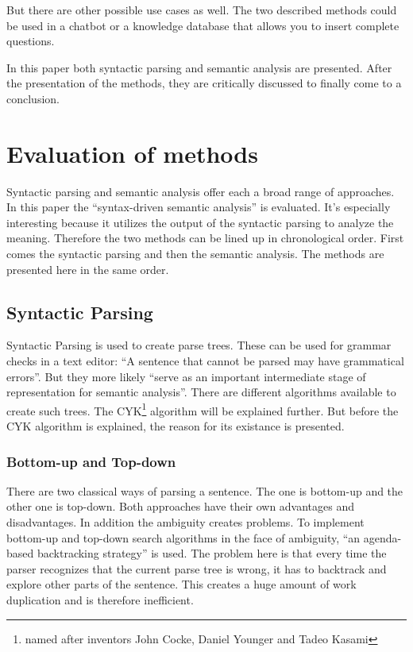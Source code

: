 \documentclass[12pt,twoside]{scrartcl}
\theoremstyle{plain}
\theoremstyle{definition}
\theoremstyle{remark}
\begin{document}
	But there are other possible use cases as well. The two described methods could be used in a chatbot or a knowledge database that allows you to insert complete questions.
	
	
	In this paper both syntactic parsing and semantic analysis are presented. After the presentation of the methods, they are critically discussed to finally come to a conclusion.

\section{Evaluation of methods}
\label{sec:evalMethods}
	
	
	Syntactic parsing and semantic analysis offer each a broad range of approaches. In this paper the ``syntax-driven semantic analysis''\cite[p.~617]{Jurafsky2009} is evaluated. It's especially interesting because it utilizes the output of the syntactic parsing to analyze the meaning. Therefore the two methods can be lined up in chronological order. First comes the syntactic parsing and then the semantic analysis. The methods are presented here in the same order. 
	
	\subsection{Syntactic Parsing}
	\label{subSec:syntacticParsing}
		Syntactic Parsing is used to create parse trees. These can be used for grammar checks in a text editor: ``A sentence that cannot be parsed may have grammatical errors''\cite[p.~461]{Jurafsky2009b}. But they more likely ``serve as an important intermediate stage of representation for semantic analysis''\cite[p.~461]{Jurafsky2009b}. There are different algorithms available to create such trees. The CYK\footnote{named after inventors John Cocke, Daniel Younger and Tadeo Kasami} algorithm will be explained further. But before the CYK algorithm is explained, the reason for its existance is presented.
		
		\subsubsection*{Bottom-up and Top-down}
		\label{subSubSec:bottomUpTopDown}
		
		There are two classical ways of parsing a sentence. The one is bottom-up and the other one is top-down. Both approaches have their own advantages and disadvantages. In addition the ambiguity creates problems. To implement bottom-up and top-down search algorithms in the face of ambiguity, ``an agenda-based backtracking strategy''\cite[p.~468]{Jurafsky2009b} is used. The problem here is that every time the parser recognizes that the current parse tree is wrong, it has to backtrack and explore other parts of the sentence. This creates a huge amount of work duplication and is therefore inefficient.
		
\end{document}
